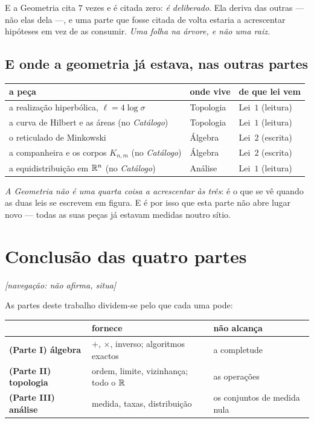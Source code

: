 \documentclass[livro.tex]{subfiles}
\begin{document}
\noindent E a Geometria cita $7$ vezes e é citada zero: \emph{é deliberado}. Ela deriva das
outras --- não elas dela ---, e uma parte que fosse citada de volta estaria a acrescentar hipóteses
em vez de as consumir. \emph{Uma folha na árvore, e não uma raiz.}

\subsection{E onde a geometria já estava, nas outras partes}\label{sec:geomapa}

\begin{center}\small
\begin{tabular}{@{}lll@{}}
\toprule
a peça & onde vive & de que lei vem \\
\midrule
a realização hiperbólica, $\ell=4\log\sigma$~\cite{series1985} & Topologia & Lei~$1$ (leitura) \\
a curva de Hilbert e as áreas (no \emph{Catálogo}) & Topologia & Lei~$1$ (leitura) \\
o reticulado de Minkowski~\cite{neukirch}     & Álgebra   & Lei~$2$ (escrita) \\
a companheira e os corpos $K_{n,m}$ (no \emph{Catálogo}) & Álgebra & Lei~$2$ (escrita) \\
a equidistribuição em $\mathbb R^{n}$ (no \emph{Catálogo})  & Análise   & Lei~$1$ (leitura) \\
\bottomrule
\end{tabular}
\end{center}

\noindent \emph{A Geometria não é uma quarta coisa a acrescentar às três}: é o que se vê quando as
duas leis se escrevem em figura. E é por isso que esta parte não abre lugar novo --- todas as suas
peças já estavam medidas noutro sítio.


\section{Conclusão das quatro partes}
\hfill \emph{\small[navegação: não afirma, situa]}
\label{sec:conc3}

As partes deste trabalho dividem-se pelo que cada uma pode:

\begin{center}\small
\begin{tabular}{lll}
\hline
& fornece & não alcança \\ \hline
\textbf{(Parte I) álgebra} & $+$, $\times$, inverso; algoritmos exactos & a completude \\
\textbf{(Parte II) topologia} & ordem, limite, vizinhança; todo o $\mathbb R$ & as operações \\
\textbf{(Parte III) análise} & medida, taxas, distribuição & os conjuntos de medida nula \\
\hline
\end{tabular}
\end{center}
\end{document}
